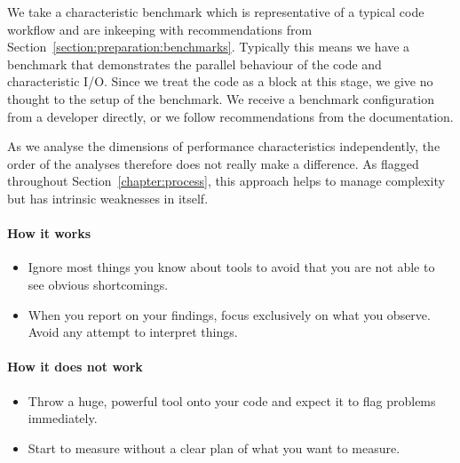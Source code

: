 We take a characteristic benchmark which is representative of a typical code workflow and are inkeeping with recommendations from Section~\ref{section:preparation:benchmarks}. Typically this means we have a benchmark that demonstrates the parallel behaviour of the code and characteristic I/O. Since we treat the code as a block at this stage, we give no thought to the setup of the benchmark. We receive a benchmark configuration from a developer directly, or we follow recommendations from the documentation.

As we analyse the dimensions of performance characteristics independently, the order of the analyses therefore does not really make a difference.
As flagged throughout Section~\ref{chapter:process}, this approach helps to manage complexity but has intrinsic weaknesses in itself.


\paragraph*{How it works}

\begin{itemize}[noitemsep]
  \item[$\boxplus$] Ignore most things you know about tools to avoid that you are not able to see obvious shortcomings.
  \item[$\boxplus$] When you report on your findings, focus exclusively on what you observe. Avoid any attempt to interpret things.
\end{itemize}


\paragraph*{How it does not work}

\begin{itemize}[noitemsep]
  \item[$\boxminus$] Throw a huge, powerful tool onto your code and expect it to flag problems immediately.
  \item[$\boxminus$] Start to measure without a clear plan of what you want to measure.
\end{itemize}


